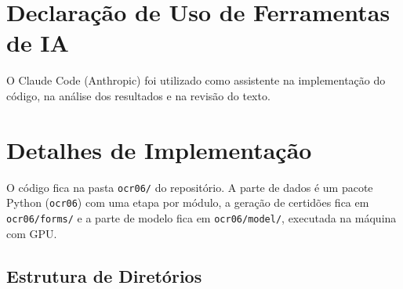\documentclass[12pt,a4paper]{article}
\begin{document}
\section*{Declaração de Uso de Ferramentas de IA}
O Claude Code (Anthropic) foi utilizado como assistente na implementação do código, na análise dos resultados e na revisão do texto.

\printbibliography

\appendix

\section{Detalhes de Implementação}
\label{app:implementacao}

O código fica na pasta \texttt{ocr06/} do repositório. A parte de dados é um pacote Python (\texttt{ocr06}) com uma etapa por módulo, a geração de certidões fica em \texttt{ocr06/forms/} e a parte de modelo fica em \texttt{ocr06/model/}, executada na máquina com GPU.

\subsection{Estrutura de Diretórios}
\end{document}
